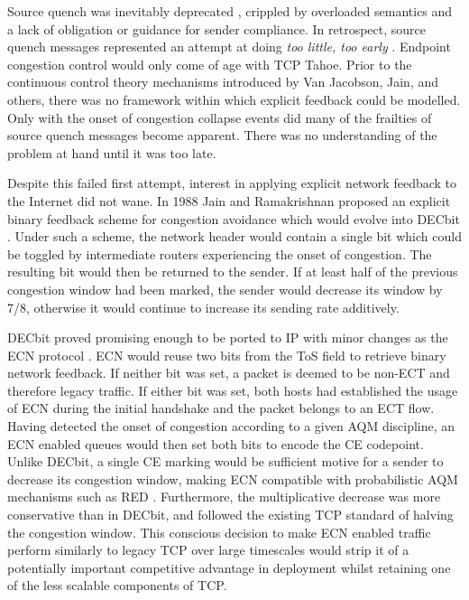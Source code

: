 Source quench was inevitably deprecated \cite{Baker:1995p479}, crippled by overloaded semantics and a lack of obligation or guidance for sender compliance.
In retrospect, source quench messages represented an attempt at doing \emph{too little, too early} \cite{Crowcroft:2003p450}.
Endpoint congestion control would only come of age with TCP Tahoe.
Prior to the continuous control theory mechanisms introduced by Van Jacobson, Jain, and others, there was no framework within which explicit feedback could be modelled.
Only with the onset of congestion collapse events did many of the frailties of source quench messages become apparent.
There was no understanding of the problem at hand until it was too late.

Despite this failed first attempt, interest in applying explicit network feedback to the Internet did not wane.
In 1988 Jain and Ramakrishnan proposed an explicit binary feedback scheme for congestion avoidance which would evolve into DECbit \cite{Ramakrishnan:1990p456}.
Under such a scheme, the network header would contain a single bit which could be toggled by intermediate routers experiencing the onset of congestion.
The resulting bit would then be returned to the sender.
If at least half of the previous congestion window had been marked, the sender would decrease its window by 7/8, otherwise it would continue to increase its sending rate additively.

DECbit proved promising enough to be ported to \ac{IP} with minor changes as the \ac{ECN} protocol \cite{Floyd:1994p491}.
\ac{ECN} would reuse two bits from the \ac{ToS} field to retrieve binary network feedback.
If neither bit was set, a packet is deemed to be non-\ac{ECT} and therefore legacy traffic.
If either bit was set, both hosts had established the usage of \ac{ECN} during the initial handshake and the packet belongs to an \ac{ECT} flow.
Having detected the onset of congestion according to a given \ac{AQM} discipline, an \ac{ECN} enabled queues would then set both bits to encode the \ac{CE} codepoint.
Unlike DECbit, a single \ac{CE} marking would be sufficient motive for a sender to decrease its congestion window, making \ac{ECN} compatible with probabilistic \ac{AQM} mechanisms such as \ac{RED} \cite{Floyd:1993p492}.
Furthermore, the multiplicative decrease was more conservative than in DECbit, and followed the existing \ac{TCP} standard of halving the congestion window.
This conscious decision to make \ac{ECN} enabled traffic perform similarly to legacy \ac{TCP} over large timescales would strip it of a potentially important competitive advantage in deployment whilst retaining one of the less scalable components of \ac{TCP}.

